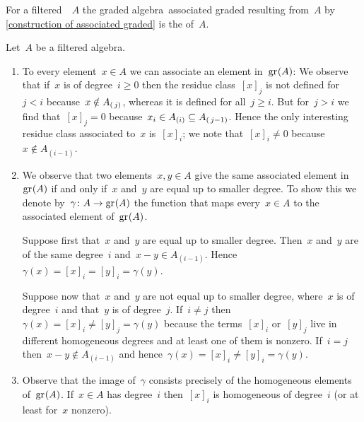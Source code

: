 \begin{definition}
  For a filtered~{\algebra{$\kf$}}~$A$ the graded algebra~\gls*{associated graded} resulting from~$A$ by \cref{construction of associated graded} is the  of~$A$.
\end{definition}


\begin{remark}
  Let~$A$ be a filtered algebra.
  \begin{enumerate}
    \item
      To every element~$x \in A$ we can associate an element in~$\gr(A)$:
      We observe that if~$x$ is of degree~$i \geq 0$ then the residue class~$[x]_j$ is not defined for~$j < i$ because~$x \notin A_{(\, j)}$, whereas it is defined for all~$j \geq i$.
      But for~$j > i$ we find that~$[x]_j = 0$ because~$x_i \in A_{(i)} \subseteq A_{(\, j-1)}$.
      Hence the only interesting residue class associated to~$x$ is~$[x]_i$;
      we note that~$[x]_i \neq 0$ because~$x \notin A_{(i-1)}$.
    \item
      We observe that two elements~$x, y \in A$ give the same associated element in~$\gr(A)$ if and only if~$x$ and~$y$ are equal up to smaller degree.
      To show this we denote by~$\gamma \colon A \to \gr(A)$ the function that maps every~$x \in A$ to the associated element of~$\gr(A)$.
      
      Suppose first that~$x$ and~$y$ are equal up to smaller degree.
      Then~$x$ and~$y$ are of the same degree~$i$ and~$x - y \in A_{(i-1)}$.
      Hence~$\gamma(x) = [x]_i = [y]_i = \gamma(y)$.
      
      Suppose now that~$x$ and~$y$ are not equal up to smaller degree, where~$x$ is of degree~$i$ and that~$y$ is of degree~$j$.
      If~$i \neq j$ then~$\gamma(x) = [x]_i \neq [y]_j = \gamma(y)$ because the terms~$[x]_i$ or~$[y]_j$ live in different homogeneous degrees and at least one of them is nonzero.
      If~$i = j$ then~$x - y \notin A_{(i-1)}$ and hence~$\gamma(x) = [x]_i \neq [y]_i = \gamma(y)$.
    \item
      Observe that the image of~$\gamma$ consists precisely of the homogeneous elements of~$\gr(A)$.
      If~$x \in A$ has degree~$i$ then~$[x]_i$ is homogeneous of degree~$i$ (or at least for~$x$ nonzero).
  \end{enumerate}
\end{remark}


